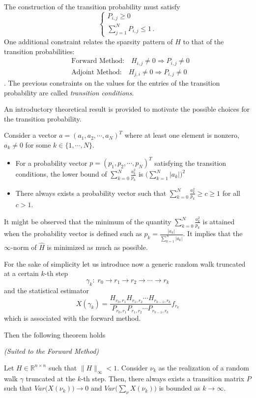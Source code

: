 The construction of the transition probability must satisfy
\[
\begin{cases}
  P_{i,j}\ge 0 \\
 \sum_{j=1}^N P_{i,j}\le 1 \,.
\end{cases}
\]
One additional constraint relates the sparsity pattern of $H$ to that
of the transition probabilities:
\begin{align*}
& \text{Forward Method:} \quad H_{i,j}\ne 0 \Rightarrow P_{i,j}\ne 0 \\ &
\text{Adjoint Method:} \quad H_{j,i}\ne 0 \Rightarrow P_{i,j}\ne 0
\end{align*}.
The previous constraints on the values for the entries of the
transition probability are called \textit{transition conditions}.

An introductory theoretical result is provided to motivate the possible
choices for the transition probability.

\begin{thm}
 Consider a vector $a=(a_1,a_2,\cdots,a_N)^T$ where at least one element is
nonzero, $a_k\ne0$ for some $k\in\{1,\cdots,N\}$.
\begin{itemize}
 \item For a probability vector $p=(p_1,p_2,\cdots,p_N)^T$ satisfying the
transition conditions, the lower bound of $\displaystyle
\sum_{k=0}^N\frac{a_k^2}{p_k}$ is $\bigg(\sum_{k=1}^N \lvert a_k\rvert\bigg)^2$
\item There always exists a probability vector such that $\displaystyle
\sum_{k=0}^N\frac{a_k^2}{p_k}\ge c\ge 1$ for all $c>1$.
\end{itemize}
\label{lemma}
\end{thm}

It might be observed that the minimum of the quantity $\displaystyle
\sum_{k=0}^N\frac{a_k^2}{p_k}$ is attained when the probability vector is
defined such as $\displaystyle p_k=\frac{\lvert a_k\rvert}{\sum_{k=1}^N \lvert
a_k\rvert}$. It implies that the $\infty$-norm of $\hat{H}$ is minimized as
much
as possible.

For the sake of simplicity let us introduce now a generic random walk
truncated at a certain $k$-th step
\[
 \gamma_k:\; r_0\rightarrow r_1 \rightarrow r_2 \rightarrow \cdots \rightarrow
r_k
\]
and the statistical estimator
\[
 X(\gamma_k)=\frac{H_{r_0,r_1}H_{r_1,r_2}\cdots
H_{r_{k-1},r_k}}{P_{r_0,r_1}P_{r_1,r_2}\cdots P_{r_{k-1},r_k}}f_{r_k}
\]
which is associated with the forward method.

Then the following theorem holds
\begin{thm}\textit{(Suited to the Forward Method)}

Let $H\in \mathbb{R}^{n\times n}$ such that $\lVert H\rVert_{\infty}<1$.
Consider $\nu_k$ as the realization of a random walk $\gamma$ truncated at the
$k$-th step. Then,
there always exists a
transition matrix $P$ such that
$Var\Big(X(\nu_k)\Big)\rightarrow 0$ and
$Var\Big(\sum_{\nu}X(\nu_k)\Big)$ is bounded as $k\rightarrow \infty$.
\label{for_thm}
\end{thm}

